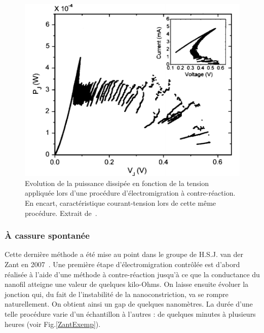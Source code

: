 \begin{figure}
\parbox{7cm}{
\includegraphics[scale=0.45]{Fabrication/ElecMigExemp/EseFig.pdf} 
}
\parbox{5cm}{\caption{Evolution de la puissance dissipée en fonction de la tension appliquée lors d'une procédure d'électromigration à contre-réaction. En encart, caractéristique courant-tension lors de cette m\^eme procédure. Extrait de~\cite{Esen2005}.}
\label{EseExemp}
}
\end{figure}


\subsubsection{À cassure spontanée}
Cette dernière méthode a été mise au point dans le groupe de H.S.J. van der Zant en 2007~\cite{ONeill2007}. Une première étape d'électromigration contrôlée est d'abord réalisée à l'aide d'une méthode à contre-réaction jusqu'à ce que la conductance du nanofil atteigne une valeur de quelques kilo-Ohms. On laisse ensuite évoluer la jonction qui, du fait de l'instabilité de la nanoconstriction, va se rompre naturellement. On obtient ainsi un gap de quelques nanomètres. La durée d'une telle procédure varie d'un échantillon à l'autres : de quelques minutes à plusieurs heures (voir Fig.\ref{ZantExemp}).

